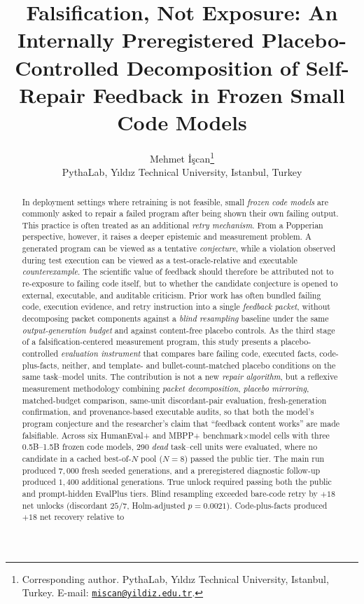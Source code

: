 \documentclass{article}
\title{\textbf{Falsification, Not Exposure: An Internally Preregistered Placebo-Controlled Decomposition of Self-Repair Feedback in Frozen Small Code Models}}
\author{Mehmet \.{I}\c{s}can\thanks{Corresponding author. PythaLab, Y{\i}ld{\i}z Technical
University, Istanbul, Turkey. E-mail: \href{mailto:miscan@yildiz.edu.tr}{\texttt{miscan@yildiz.edu.tr}}.}\\
\small PythaLab, Y{\i}ld{\i}z Technical University, Istanbul, Turkey}
\date{}
\numberwithin{equation}{section}  %
\theoremstyle{definition}
\begin{document}
\maketitle

\begin{abstract}
\noindent
In deployment settings where retraining is not feasible, small \emph{frozen code models} are commonly asked to repair a failed program 
after being shown their own failing output. This practice is often treated as an additional \emph{retry mechanism}.
From a Popperian perspective, however, it raises a deeper epistemic and measurement problem. 
A generated program can be viewed as a tentative \emph{conjecture}, while a 
violation observed during test execution can be viewed as a test-oracle-relative 
and executable \emph{counterexample}. The scientific value of feedback should therefore 
be attributed not to re-exposure to failing code itself, but to whether the candidate 
conjecture is opened to external, executable, and auditable criticism. Prior work has often bundled failing code, 
execution evidence, and retry instruction into a single \emph{feedback packet}, without decomposing packet components 
against a \emph{blind resampling} baseline under the same \emph{output-generation budget} and against content-free 
placebo controls. As the third stage of a falsification-centered measurement program, this study presents a 
placebo-controlled \emph{evaluation instrument} that compares bare failing code, executed facts, code-plus-facts, 
neither, and template- and bullet-count-matched placebo conditions on the same task--model units. The contribution 
is not a new \emph{repair algorithm}, but a reflexive measurement methodology combining \emph{packet decomposition}, \emph{placebo mirroring}, 
matched-budget comparison, same-unit discordant-pair evaluation, fresh-generation confirmation, and provenance-based executable audits, 
so that both the model's program conjecture and the researcher's claim that ``feedback content works'' are made falsifiable. 
Across six HumanEval+ and MBPP+ benchmark$\times$model cells with three 0.5B--1.5B frozen code models, 290 \emph{dead} task--cell 
units were evaluated, where no candidate in a cached best-of-$N$ pool ($N=8$) passed the public tier. The main run produced $7{,}000$ 
fresh seeded generations, and a preregistered diagnostic follow-up produced $1{,}400$ additional generations. True unlock required 
passing both the public and prompt-hidden EvalPlus tiers. Blind resampling exceeded bare-code retry by $+18$ net 
unlocks (discordant $25/7$, Holm-adjusted $p=0.0021$). Code-plus-facts produced $+18$ net recovery relative to 

\end{abstract}
\end{document}
